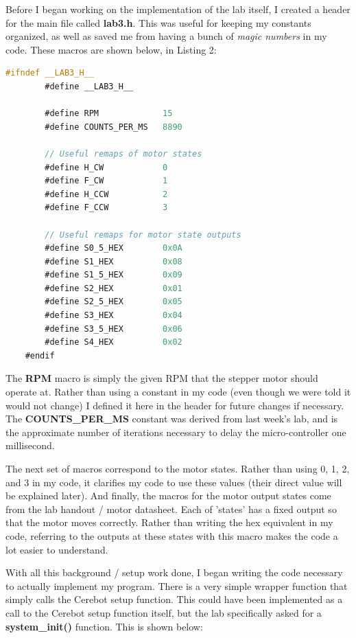 \documentclass[a4paper, 12pt]{article}
\begin{document}
Before I began working on the implementation of the lab itself, I created a header for the main file called \textbf{lab3.h}. This was useful for keeping my constants organized, as well as saved me from having a bunch of \textit{magic numbers} in my code. These macros are shown below, in Listing 2:

	\begin{mdframed}[backgroundcolor=code-gray, roundcorner=10pt,
								innerleftmargin=5, innertopmargin=5, innerbottommargin=5]	
	\begin{lstlisting}[language=C, caption=Main Program Header File, tabsize=2]
	#ifndef __LAB3_H__
		#define __LAB3_H__

		#define RPM             15
		#define COUNTS_PER_MS   8890

		// Useful remaps of motor states
		#define H_CW            0
		#define F_CW            1  
		#define H_CCW           2
		#define F_CCW           3

		// Useful remaps for motor state outputs
		#define S0_5_HEX        0x0A
		#define S1_HEX          0x08
		#define S1_5_HEX        0x09
		#define S2_HEX          0x01
		#define S2_5_HEX        0x05
		#define S3_HEX          0x04
		#define S3_5_HEX        0x06
		#define S4_HEX          0x02
	#endif
	\end{lstlisting}
	\end{mdframed}
	
The \textbf{RPM} macro is simply the given RPM that the stepper motor should operate at. Rather than using a constant in my code (even though we were told it would not change) I defined it here in the header for future changes if necessary. The \textbf{COUNTS\_PER\_MS} constant was derived from last week's lab, and is the approximate number of iterations necessary to delay the micro-controller one millisecond.

The next set of macros correspond to the motor states. Rather than using 0, 1, 2, and 3 in my code, it clarifies my code to use these values (their direct value will be explained later). And finally, the macros for the motor output states come from the lab handout / motor datasheet. Each of 'states' has a fixed output so that the motor moves correctly. Rather than writing the hex equivalent in my code, referring to the outputs at these states with this macro makes the code a lot easier to understand.

With all this background / setup work done, I began writing the code necessary to actually implement my program. There is a very simple wrapper function that simply calls the Cerebot setup function. This could have been implemented as a call to the Cerebot setup function itself, but the lab specifically asked for a \textbf{system\_init()} function. This is shown below:
\end{document}
